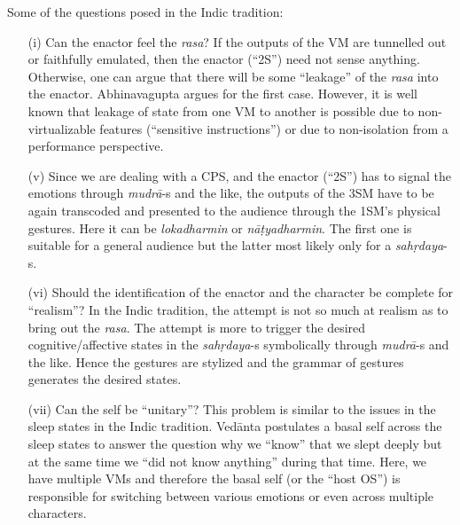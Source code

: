 Some of the questions posed in the Indic tradition:
\begin{itemize}
\itemsep=0pt
\item[(i)] Can the enactor feel the \textsl{rasa}? If the outputs of the VM are tunnelled out or faithfully emulated, then the enactor (“2S”) need not sense anything. Otherwise, one can argue that there will be some “leakage” of the \textsl{rasa} into the enactor. Abhinavagupta argues for the first case. However, it is well known that leakage of state from one VM to another is possible due to non-virtualizable features (“sensitive instructions”) or due to non-isolation from a performance perspective. 

\item[(v)] Since we are dealing with a CPS, and the enactor (“2S”) has to signal the emotions through \textsl{mudrā}-s and the like, the outputs of the 3SM have to be again transcoded and presented to the audience through the 1SM’s physical gestures. Here it can be \textsl{lokadharmin} or \textsl{nāṭyadharmin}. The first one is suitable for a general audience but the latter most likely only for a \textsl{sahṛdaya}-s.

\item[(vi)] Should the identification of the enactor and the character be complete for “realism”? In the Indic tradition, the attempt is not so much at realism as to bring out the \textsl{rasa}. The attempt is more to trigger the desired cognitive/affective states in the \textsl{sahṛdaya}-s symbolically through \textsl{mudrā}-s and the like. Hence the gestures are stylized and the grammar of gestures generates the desired states.

\item[(vii)] Can the self be “unitary”? This problem is similar to the issues in the sleep states in the Indic tradition. Vedānta postulates a basal self across the sleep states to answer the question why we “know” that we slept deeply but at the same time we “did not know anything” during that time. Here, we have multiple VMs and therefore the basal self (or the “host OS”) is responsible for switching between various emotions or even across multiple characters.
\end{itemize}


